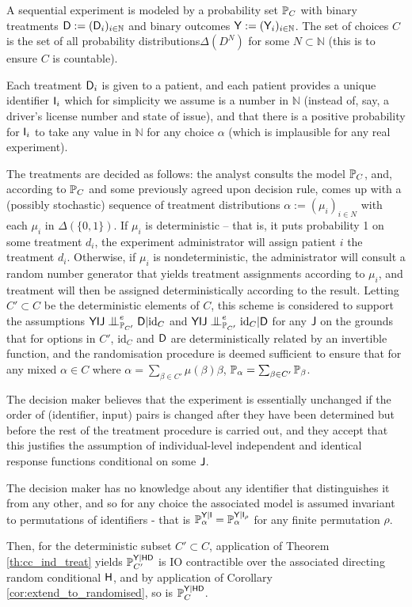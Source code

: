 \begin{example}\label{ex:randomised_experiment}
A sequential experiment is modeled by a probability set $\mathbb{P}_C$ with binary treatments $\mathsf{D}:=(\mathsf{D}_i)_{i\in \mathbb{N}}$ and binary outcomes $\mathsf{Y}:=(\mathsf{Y}_i)_{i\in\mathbb{N}}$. The set of choices $C$ is the set of all probability distributions$\Delta(D^N)$ for some $N\subset\mathbb{N}$ (this is to ensure $C$ is countable).

Each treatment $\mathsf{D}_i$ is given to a patient, and each patient provides a unique identifier $\mathsf{I}_i$ which for simplicity we assume is a number in $\mathbb{N}$ (instead of, say, a driver's license number and state of issue), and that there is a positive probability for $\mathsf{I}_i$ to take any value in $\mathbb{N}$ for any choice $\alpha$ (which is implausible for any real experiment).

The treatments are decided as follows: the analyst consults the model $\mathbb{P}_C$, and, according to $\mathbb{P}_C$ and some previously agreed upon decision rule, comes up with a (possibly stochastic) sequence  of treatment distributions $\alpha:=(\mu_i)_{i\in N}$ with each $\mu_i$ in $\Delta(\{0,1\})$. If $\mu_i$ is deterministic -- that is, it puts probability 1 on some treatment $d_i$, the experiment administrator will assign patient $i$ the treatment $d_i$. Otherwise, if $\mu_i$ is nondeterministic, the administrator will consult a random number generator that yields treatment assignments according to $\mu_i$, and treatment will then be assigned deterministically according to the result. Letting $C'\subset C$ be the deterministic elements of $C$, this scheme is considered to support the assumptions $\RV{YIJ}\CI^e_{\prob{P}_{C'}} \RV{D}|\text{id}_C$ and $\RV{YIJ}\CI^e_{\prob{P}_{C'}} \text{id}_C|\RV{D}$ for any $\mathsf{J}$ on the grounds that for options in $C'$, $\text{id}_C$ and $\mathsf{D}$ are deterministically related by an invertible function, and the randomisation procedure is deemed sufficient to ensure that for any mixed $\alpha\in C$ where $\alpha = \sum_{\beta\in C'} \mu(\beta) \beta$, $\mathbb{P}_\alpha = \sum_{\beta\in C'} \mathbb{P}_\beta$.

The decision maker believes that the experiment is essentially unchanged if the order of (identifier, input) pairs is changed after they have been determined but before the rest of the treatment procedure is carried out, and they accept that this justifies the assumption of individual-level independent and identical response functions conditional on some $\mathsf{J}$.

The decision maker has no knowledge about any identifier that distinguishes it from any other, and so for any choice the associated model is assumed invariant to permutations of identifiers - that is $\mathbb{P}_\alpha^{\mathsf{Y}|\mathsf{I}} = \mathbb{P}_\alpha^{\mathsf{Y}|\mathsf{I}_\rho}$ for any finite permutation $\rho$.

Then, for the deterministic subset $C'\subset C$, application of Theorem \ref{th:cc_ind_treat} yields $\mathbb{P}_{C'}^{\mathsf{Y}|\mathsf{HD}}$ is IO contractible over the associated directing random conditional $\mathsf{H}$, and by application of Corollary \ref{cor:extend_to_randomised}, so is $\mathbb{P}_{C}^{\mathsf{Y}|\mathsf{HD}}$.
\end{example}

